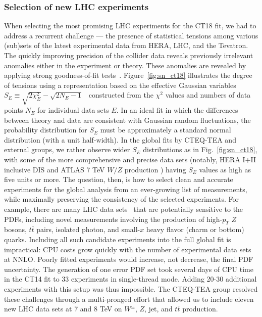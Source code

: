 \subsubsection{Selection of new LHC experiments \label{sec:ExptSelection} }
When selecting the 
most promising LHC experiments for the CT18 fit, 
we had to address a recurrent challenge --- the presence of statistical
tensions among various (sub)sets of the latest experimental data from
HERA, LHC, and the Tevatron. The quickly improving precision of the collider
data reveals previously irrelevant anomalies either in the experiment
or theory. These anomalies are revealed by applying strong goodness-of-fit
tests~\cite{Kovarik:2019xvh}. Figure~\ref{fig:sn_ct18}
illustrates the degree of tensions using a representation based on the effective
Gaussian variables $S_E\equiv \sqrt{2\chi_E^2}-\sqrt{2 N_E-1}$~\cite{Lai:2010vv}
constructed from the $\chi^2$ values and numbers of data points $N_\mathit{E}$ for
individual data sets $E$. In an ideal fit in which the differences between theory and data are consistent with Gaussian random fluctuations, the probability
distribution for $S_E$ must be approximately a standard normal
distribution (with a unit half-width). In the global fits by CTEQ-TEA and  external groups, we rather observe wider $S_E$ distributions
as in Fig.~\ref{fig:sn_ct18}, with some of the more comprehensive
and precise data sets (notably, HERA I+II inclusive DIS
\cite{Abramowicz:2015mha} and ATLAS 7 TeV $W/Z$ production
\cite{Aaboud:2016btc}) having $S_E$ values as high as five units or more.  
The question, then, is how to select clean and accurate experiments for
the global analysis from an ever-growing list of measurements, while
maximally preserving the consistency of the selected experiments. 
For example, there are many LHC data sets~\cite{Rojo:2015acz}
that are potentially sensitive to the PDFs, including novel measurements
involving the production of high-$p_{T}$ $Z$ bosons, $t\bar{t}$ pairs,
isolated photon, and small-$x$ heavy flavor (charm or bottom) quarks.
Including all such candidate experiments
into the full global fit is impractical: CPU costs grow quickly with
the number of experimental data sets at NNLO. Poorly fitted experiments
would increase, not decrease, the final PDF uncertainty. The generation
of one error PDF set took several days of CPU time in the CT14 fit
to 33 experiments in single-thread mode. Adding 20-30 additional
experiments with this setup was thus impossible.
The CTEQ-TEA group resolved
these challenges through a multi-pronged effort that allowed us
to include eleven new LHC data sets at 7 and 8 TeV on $W^\pm$, $Z$, jet, and $t\bar{t}$ production. 


